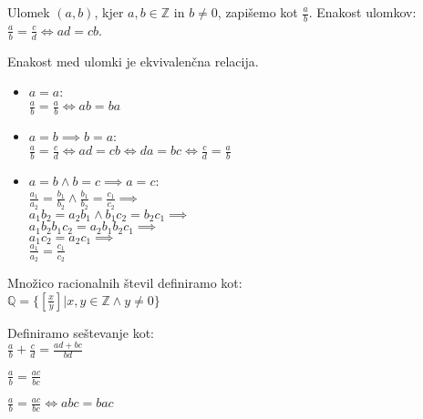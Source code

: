 \begin{definicija}
    Ulomek $(a, b)$, kjer $a,b \in \mathbb{Z}$ in $b \neq 0$, zapišemo kot $\frac{a}{b}$.
    Enakost ulomkov: $\frac{a}{b} = \frac{c}{d} \iff ad = cb$.
\end{definicija}

\begin{trditev}
    Enakost med ulomki je ekvivalenčna relacija.
\end{trditev}
\begin{dokaz}
    \begin{itemize}
        \item $a = a$: \\
        $\frac{a}{b} = \frac{a}{b} \iff ab = ba$
        \item $a = b \implies b = a$: \\
        $\frac{a}{b} = \frac{c}{d} \iff ad = cb \iff da = bc \iff \frac{c}{d} = \frac{a}{b}$
        \item $a = b \wedge b = c \implies a = c$: \\
        $\frac{a_1}{a_2} = \frac{b_1}{b_2} \wedge \frac{b_1}{b_2} = \frac{c_1}{c_2} \implies$ \\
        $a_1 b_2 = a_2 b_1 \wedge b_1 c_2 = b_2 c_1 \implies$ \\
        $a_1 b_2 b_1 c_2 = a_2 b_1 b_2 c_1 \implies $\\
        $a_1 c_2 = a_2 c_1 \implies $\\
        $\frac{a_1}{a_2} = \frac{c_1}{c_2}$
    \end{itemize}
\end{dokaz}

\begin{definicija}
    Množico racionalnih števil definiramo kot: \\
    $\mathbb{Q} = \{\left[\frac{x}{y}\right] | x, y \in \mathbb{Z} \wedge y \neq 0\}$
\end{definicija}

\begin{definicija}
    Definiramo seštevanje kot: \\
    $\frac{a}{b} + \frac{c}{d} = \frac{ad + bc}{bd}$
\end{definicija}

\begin{trditev}
    $\frac{a}{b} = \frac{ac}{bc}$
\end{trditev}
\begin{dokaz}
    $\frac{a}{b} = \frac{ac}{bc} \iff abc = bac$
\end{dokaz}


